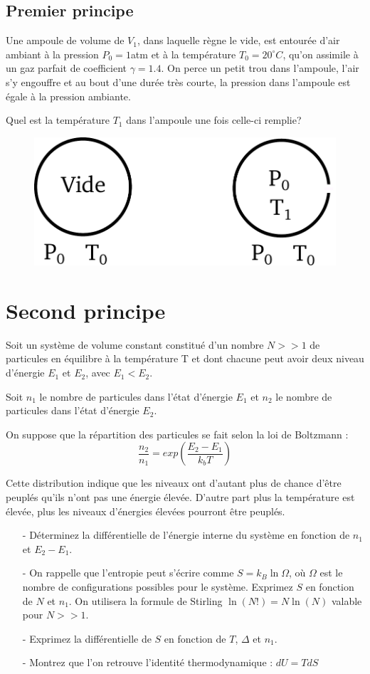 \documentclass{report}
\begin{document}
\subsection*{Premier principe}

Une ampoule de volume de $V_1$, dans laquelle règne le vide, est entourée d'air ambiant à la pression $P_{0} = 1$atm et à la température $T_{0}=20^{\circ}C$, qu'on assimile à un gaz parfait de coefficient $\gamma=1.4$. On perce un petit trou dans l'ampoule, l'air s'y engouffre et au bout d'une durée très courte, la pression dans l'ampoule est égale à la pression ambiante.

Quel est la température $T_{1}$ dans l'ampoule une fois celle-ci remplie?

\begin{figure}[!h]
\centering
\includegraphics[width=0.5\linewidth]{ampoule.pdf}
\end{figure}

\section*{Second principe}

Soit un système de volume constant constitué d'un nombre $N>>1$ de particules en équilibre à la température T et dont chacune peut avoir deux niveau d'énergie $E_{1}$ et $E_{2}$, avec $E_{1}<E_{2}$.

Soit $n_{1}$ le nombre de particules dans l'état d'énergie $E_{1}$ et $n_{2}$ le nombre de particules dans l'état d'énergie $E_{2}$.

On suppose que la répartition des particules se fait selon la loi de Boltzmann :
\begin{equation}
\frac{n_{2}}{n_{1}}=exp\left( \frac{E_{2}-E_{1}}{k_{b}T}\right) 
\end{equation}

Cette distribution indique que les niveaux ont d'autant plus de chance d'être peuplés qu'ils n'ont pas une énergie élevée. D'autre part plus la température est élevée, plus les niveaux d'énergies élevées pourront être peuplés. 

\begin{itemize}
\item[-]Déterminez la différentielle de l'énergie interne du système en fonction de $n_{1}$ et $E_{2}-E_{1}$.
\item[-]On rappelle que l'entropie peut s'écrire comme $S=k_B\ln\Omega$, où $\Omega$ est le nombre de configurations possibles pour le système. Exprimez $S$ en fonction de $N$ et $n_1$. On utilisera la formule de Stirling $\ln (N!)=N \ln (N)$ valable pour $N>>1$.
\item[-] Exprimez la différentielle de $S$ en fonction de $T$, $\Delta$ et $n_1$.
\item[-] Montrez que l'on retrouve l'identité thermodynamique : $dU = TdS$
\end{itemize}
\end{document}
